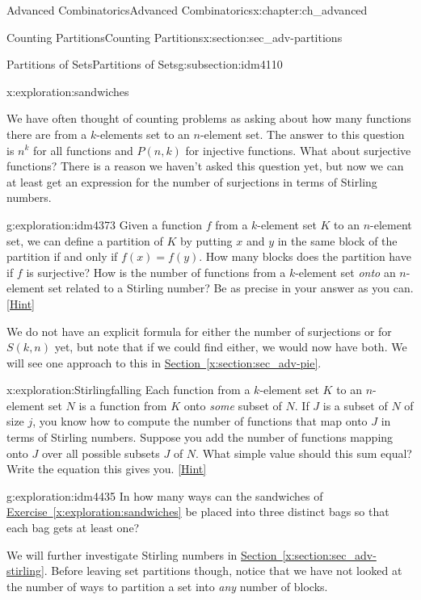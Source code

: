 \documentclass[oneside,10pt,]{book}
\numberwithin{equation}{chapter}
\begin{document}
\begin{chapterptx}{Advanced Combinatorics}{}{Advanced Combinatorics}{}{}{x:chapter:ch_advanced}
\begin{sectionptx}{Counting Partitions}{}{Counting Partitions}{}{}{x:section:sec_adv-partitions}
\begin{subsectionptx}{Partitions of Sets}{}{Partitions of Sets}{}{}{g:subsection:idm4110}
\begin{exploration}{}{x:exploration:sandwiches}
\end{exploration}
We have often thought of counting problems as asking about how many functions there are from a \(k\)-elements set to an \(n\)-element set.  The answer to this question is \(n^k\) for all functions and \(P(n,k)\) for injective functions.  What about surjective functions?  There is a reason we haven't asked this question yet, but now we can at least get an expression for the number of surjections in terms of Stirling numbers.%
\begin{exploration}{}{g:exploration:idm4373}%
Given a function \(f\) from a \(k\)-element set \(K\) to an \(n\)-element set, we can define a partition of \(K\) by putting \(x\) and \(y\) in the same block of the partition if and only if \(f(x)=f(y)\). How many blocks does the partition have if \(f\) is surjective? How is the number of functions from a \(k\)-element set \emph{onto} an \(n\)-element set related to a Stirling number? Be as precise in your answer as you can.%
\space\hspace*{0pt}\hfill{\tiny\hyperlink{g:hint:idm4394-back}{[Hint]}}\end{exploration}
We do not have an explicit formula for either the number of surjections or for \(S(k,n)\) yet, but note that if we could find either, we would now have both.  We will see one approach to this in \hyperref[x:section:sec_adv-pie]{Section~\ref{x:section:sec_adv-pie}}.%
\begin{exploration}{}{x:exploration:Stirlingfalling}%
Each function from a \(k\)-element set \(K\) to an \(n\)-element set \(N\) is a function from \(K\) onto \emph{some} subset of \(N\). If \(J\) is a subset of \(N\) of size \(j\), you know how to compute the number of functions that map onto \(J\) in terms of Stirling numbers. Suppose you add the number of functions mapping onto \(J\) over all possible subsets \(J\) of \(N\). What simple value should this sum equal? Write the equation this gives you.%
\space\hspace*{0pt}\hfill{\tiny\hyperlink{g:hint:idm4424-back}{[Hint]}}\end{exploration}
\begin{exploration}{}{g:exploration:idm4435}%
In how many ways can the sandwiches of \hyperref[x:exploration:sandwiches]{Exercise~\ref{x:exploration:sandwiches}} be placed into three distinct bags so that each bag gets at least one?%
\end{exploration}
We will further investigate Stirling numbers in \hyperref[x:section:sec_adv-stirling]{Section~\ref{x:section:sec_adv-stirling}}.  Before leaving set partitions though, notice that we have not looked at the number of ways to partition a set into \emph{any} number of blocks.%

\end{subsectionptx}
\end{sectionptx}
\end{chapterptx}
\end{document}
